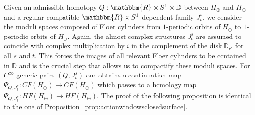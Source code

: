 \documentclass[AHL,Unicode,longabstracts,published]{cedram}
\newcommand{\R}{\mathbbm{R}}
\newcommand{\D}{\mathbb{D}}
\begin{document}
Given an admissible homotopy $Q: \R \times S^1 \times \D$ between $H_\oplus$ and $H_\ominus$ and a regular compatible $\R \times S^1$-dependent family $J^s_t$, we consider the moduli spaces composed of Floer cylinders from $1$-periodic orbits of $H_\oplus$ to $1$-periodic orbits of $H_\ominus$. Again, the almost complex structures $J^s_t$ are assumed to coincide with complex multiplication by $i$ in the complement of the disk $\D_{r'}$ for all $s$ and $t$. This forces the images of all relevant Floer cylinders to be contained in $\D$ and is the crucial step that allows us to compactify these moduli spaces. For $C^\infty$-generic pairs $(Q,J^s_t)$ one obtains a continuation map $\Psi_{Q,J^s_t}: CF(H_\oplus) \to CF(H_\ominus)$ which passes to a homology map $\Psi_{Q,J^s_t}: HF(H_\oplus) \to HF(H_\ominus)$. The proof of the following proposition is identical to the one of Proposition~\ref{prop:actionwindowsclosedsurface}.
\end{document}
